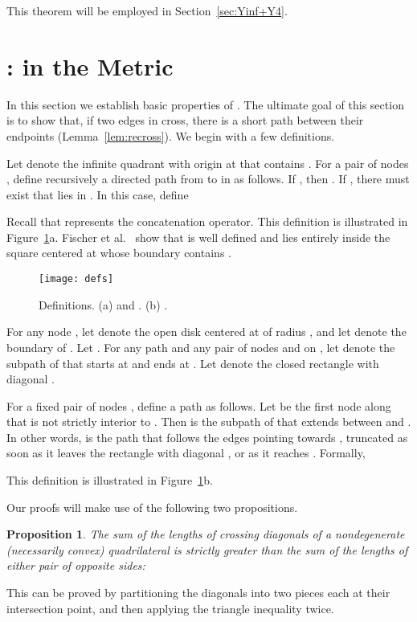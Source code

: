 \pdfoutput=1  \documentclass[11pt]{article}
\newtheorem{proposition}{Proposition}
\begin{document}
\noindent
This theorem will be employed in Section~\ref{sec:Yinf+Y4}.

\section{: in the  Metric}
\label{secY4L2}
In this section we establish basic properties of . The ultimate goal of this section is
to show that, if two edges in  cross, there is a short path between their endpoints (Lemma~\ref{lem:recross}). We
begin with a few definitions.

Let  denote the infinite quadrant with origin at  that contains .
For a pair of nodes , define recursively a directed path
 from  to  in  as follows.
If , then .
If , there must exist  that
lies in . In this case, define

Recall that  represents the concatenation operator.
This definition is illustrated in Figure~\ref{fig:defs}a.
Fischer et al.~\cite{FLZ98} show that  is well defined and
lies entirely inside the square centered at  whose boundary contains .


\begin{figure}[htbp]
\centering
\texttt{[image: defs]}
\caption{Definitions. (a)  and . (b) .}
\label{fig:defs}
\end{figure}


For any node , let  denote the open disk centered at
 of radius , and let  denote the boundary of
. Let .
For any path  and any pair of nodes  and  on , let 
denote the subpath of  that starts at  and ends at .
Let  denote the closed rectangle with diagonal .

For a fixed pair of nodes , define a path
 as follows. Let  be the first node
along  that is not strictly interior to
. Then  is the subpath of 
that extends between  and . In other words,  is
the path that follows the  edges pointing towards ,  truncated as soon
as it leaves the rectangle with diagonal , or as it reaches . Formally,

This definition is illustrated in Figure~\ref{fig:defs}b.

Our proofs will make use of the following two propositions.

\begin{proposition}
The sum of the lengths of crossing diagonals of a nondegenerate
(necessarily convex) quadrilateral  is strictly greater than the sum of
the lengths of either pair of opposite sides:

\label{fact:quad}
\end{proposition}
This can be proved by partitioning
the diagonals into two pieces each at their intersection
point, and then applying the triangle inequality twice.
\end{document}
